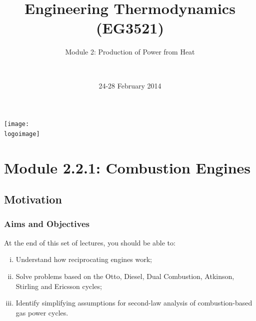 \documentclass[10pt,compress]{beamer}
\institute{School of Engineering}
\title{Engineering Thermodynamics (EG3521)}
\subtitle{Module 2: Production of Power from Heat}
\date[24-28/02/2014]{24-28 February 2014}
\author[\shortname]{%
  \fullname\\\ttfamily{\emailaddress}
}
\newcommand{\logoimage}{../FigBanner/UoAHorizBanner}
\begin{document}
\begin{frame}
  \titlepage
  \vfill%
  \begin{center}
    \texttt{[image: \\logoimage]}
  \end{center}
\end{frame}




\section{Module 2.2.1: Combustion Engines}

\subsection{Motivation}
\begin{frame}
 \frametitle{Aims and Objectives}
 At the end of this set of lectures, you should be able to:
 \begin{enumerate}[(i)]
  \item <1-> Understand how reciprocating engines work;
  \item <2-> Solve problems based on the Otto, Diesel, Dual Combustion, Atkinson, Stirling and Ericsson cycles;
  \item <3-> Identify simplifying assumptions for second-law analysis of combustion-based gas power cycles.
 \end{enumerate}
\end{frame}

 
\end{document}
